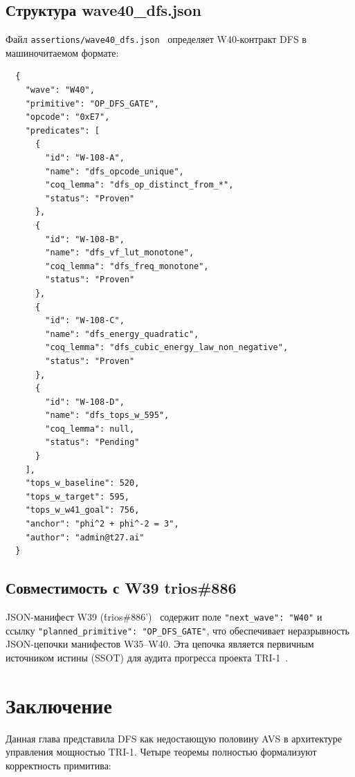 \subsection{Структура wave40\_dfs.json}
\label{subsec:json-structure}

Файл \texttt{assertions/wave40\_dfs.json}~\cite{trios886} определяет
W40-контракт DFS в машиночитаемом формате:
\begin{verbatim}
  {
    "wave": "W40",
    "primitive": "OP_DFS_GATE",
    "opcode": "0xE7",
    "predicates": [
      {
        "id": "W-108-A",
        "name": "dfs_opcode_unique",
        "coq_lemma": "dfs_op_distinct_from_*",
        "status": "Proven"
      },
      {
        "id": "W-108-B",
        "name": "dfs_vf_lut_monotone",
        "coq_lemma": "dfs_freq_monotone",
        "status": "Proven"
      },
      {
        "id": "W-108-C",
        "name": "dfs_energy_quadratic",
        "coq_lemma": "dfs_cubic_energy_law_non_negative",
        "status": "Proven"
      },
      {
        "id": "W-108-D",
        "name": "dfs_tops_w_595",
        "coq_lemma": null,
        "status": "Pending"
      }
    ],
    "tops_w_baseline": 520,
    "tops_w_target": 595,
    "tops_w_w41_goal": 756,
    "anchor": "phi^2 + phi^-2 = 3",
    "author": "admin@t27.ai"
  }
\end{verbatim}

\subsection{Совместимость с W39 trios\#886}
\label{subsec:w39-compatibility}

JSON-манифест W39 (\'trios\#886')~\cite{trios886} содержит поле
\texttt{"next\_wave": "W40"} и ссылку
\texttt{"planned\_primitive": "OP\_DFS\_GATE"}, что обеспечивает
неразрывность JSON-цепочки манифестов W35--W40.
Эта цепочка является первичным источником истины (SSOT)
для аудита прогресса проекта TRI-1~\cite{trios882}.

\section{Заключение}
\label{sec:glava86-conclusion}

Данная глава представила DFS как недостающую половину AVS в архитектуре
управления мощностью TRI-1.  Четыре теоремы полностью формализуют
корректность примитива:


